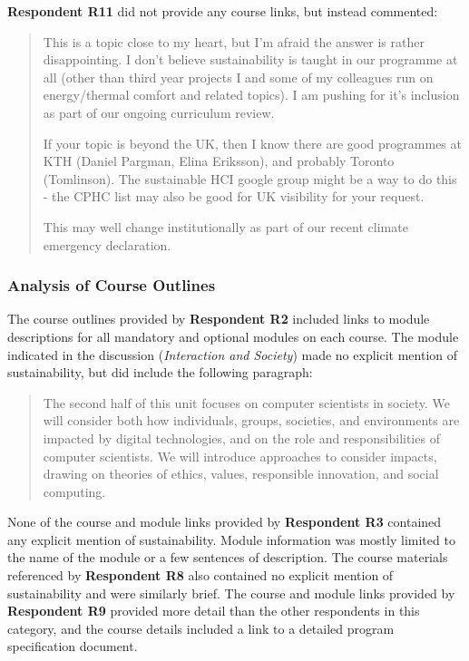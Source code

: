 \textbf{Respondent R11} did not provide any course links, but instead commented:
\begin{quote}
    This is a topic close to my heart, but I'm afraid the answer is rather disappointing.  I don't believe sustainability is taught in our programme at all (other than third year projects I and some of my colleagues run on energy/thermal comfort and related topics).  I am pushing for it's inclusion as part of our ongoing curriculum review.
    
    If your topic is beyond the UK, then I know there are good programmes at KTH (Daniel Pargman, Elina Eriksson), and probably Toronto (Tomlinson).  The sustainable HCI google group might be a way to do this - the CPHC list may also be good for UK visibility for your request.
    
    This may well change institutionally as part of our recent climate emergency declaration.
\end{quote}

\subsubsection*{Analysis of Course Outlines}

The course outlines provided by \textbf{Respondent R2} included links to module descriptions for all mandatory and optional modules on each course. The module indicated in the discussion (\emph{Interaction and Society}) made no explicit mention of sustainability, but did include the following paragraph:
\begin{quote}
    The second half of this unit focuses on computer scientists in society. We will consider both how individuals, groups, societies, and environments are impacted by digital technologies, and on the role and responsibilities of computer scientists. We will introduce approaches to consider impacts, drawing on theories of ethics, values, responsible innovation, and social computing.
\end{quote}

None of the course and module links provided by \textbf{Respondent R3} contained any explicit mention of sustainability. Module information was mostly limited to the name of the module or a few sentences of description. The course materials referenced by \textbf{Respondent R8} also contained no explicit mention of sustainability and were similarly brief. The course and module links provided by \textbf{Respondent R9} provided more detail than the other respondents in this category, and the course details included a link to a detailed program specification document. 

